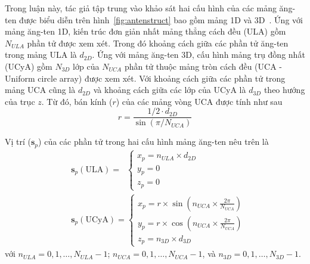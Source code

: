 Trong luận này, tác giả tập trung vào khảo sát hai cấu hình của các mảng ăng-ten được biểu diễn trên hình~\ref{fig:antenstruct} bao gồm mảng 1D và 3D~\cite{POORMOHAMMAD2017}. Ứng với mảng ăng-ten 1D, kiến trúc đơn giản nhất mảng thẳng cách đều (ULA) gồm $N_{ULA}$ phần tử được xem xét. Trong đó khoảng cách giữa các phần tử ăng-ten trong mảng ULA là $d_{2D}$. Ứng với mảng ăng-ten 3D, cấu hình mảng trụ đồng nhất (UCyA) gồm $N_{3D}$ lớp của $N_{UCA}$ phần tử thuộc mảng tròn cách đều (UCA - Uniform circle array) được xem xét. Với khoảng cách giữa các phần tử trong mảng UCA cũng là $d_{2D}$ và khoảng cách giữa các lớp của UCyA là $d_{3D}$ theo hướng của trục $z$. Từ đó, bán kính ($r$) của các mảng vòng UCA được tính như sau
\begin{equation}
    r = \frac{1/2 \cdot d_{2D}}{\sin(\pi/N_{UCA})}
\end{equation}

Vị trí ($\boldsymbol{s}_p$) của các phần tử trong hai cấu hình mảng ăng-ten nêu trên là
\begin{align} 
    &\boldsymbol{s}_p(\text{ULA}) = \;\; \begin{cases}
    x_p = n_{ULA} \times d_{2D}\\ 
    y_p = 0\\ 
    z_p = 0
    \end{cases}
    \\
    &\boldsymbol{s}_p(\text{UCyA}) = \begin{cases}
    x_p = r \times \sin(n_{UCA} \times \frac{2\pi}{N_{UCA}})\\ 
    y_p = r \times \cos(n_{UCA} \times \frac{2\pi}{N_{UCA}})\\ 
    z_p = n_{3D} \times d_{3D}
    \end{cases}
\end{align}
với $n_{ULA} = 0, 1, \ldots, N_{ULA}-1$; $n_{UCA} = 0, 1, \ldots, N_{UCA}-1$, và $n_{3D} = 0, 1, \ldots, N_{3D}-1$.


